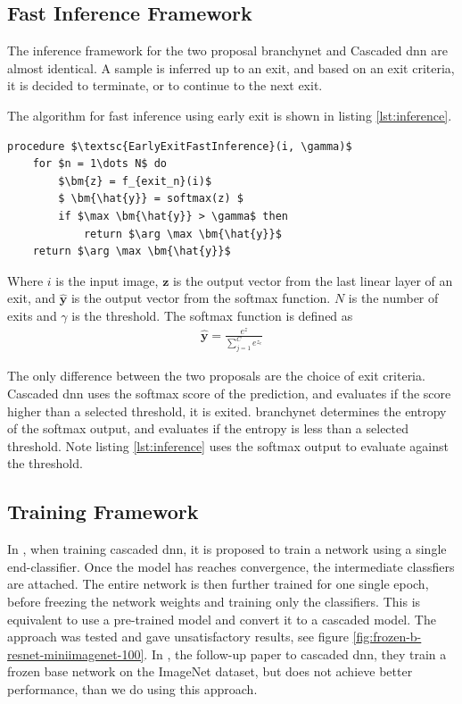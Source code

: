 \subsection{Fast Inference Framework} 

The inference framework for the two proposal \gls{branchynet} and Cascaded \gls{dnn} are almost identical. A sample is inferred up to an exit, and based on an exit criteria, it is decided to terminate, or to continue to the next exit. 

The algorithm for fast inference using early exit is shown in listing \ref{lst:inference}. 

\begin{minipage}{\linewidth}
	\begin{lstlisting}[language = {}, mathescape=true, caption={Early Exit Fast Inference }, label={lst:inference}]
procedure $\textsc{EarlyExitFastInference}(i, \gamma)$
	for $n = 1\dots N$ do
		$\bm{z} = f_{exit_n}(i)$
		$ \bm{\hat{y}} = softmax(z) $
		if $\max \bm{\hat{y}} > \gamma$ then
			return $\arg \max \bm{\hat{y}}$
	return $\arg \max \bm{\hat{y}}$ 
	\end{lstlisting}
\end{minipage}

Where $ i $ is the input image, $ \bm{z} $ is the output vector from the last linear layer of an exit, and $ \bm{\hat{y}} $ is the output vector from the softmax function. $ N $ is the number of exits and $ \gamma $ is the threshold. The softmax function is defined as
\begin{align}
\bm{\hat{y}} = \frac{e^{z}}{\sum_{j=1}^{C}e^{z_c}}
\end{align}

The only difference between the two proposals are the choice of exit criteria. Cascaded \gls{dnn} uses the softmax score of the prediction, and evaluates if the score higher than a selected threshold, it is exited. \gls{branchynet} determines the entropy of the softmax output, and evaluates if the entropy is less than a selected threshold. Note listing \ref{lst:inference} uses the softmax output to evaluate against the threshold.

\subsection{Training Framework} 

In \cite{leroux_resource-constrained_2015}, when training cascaded \gls{dnn}, it is proposed to train a network using a single end-classifier. Once the model has reaches convergence, the intermediate classfiers are attached. The entire network is then further trained for one single epoch, before freezing the network weights and training only the classifiers. This is equivalent to use a pre-trained model and convert it to a cascaded model. The approach was tested and gave unsatisfactory results, see figure \ref{fig:frozen-b-resnet-miniimagenet-100}. In \cite{leroux_cascading_2017}, the follow-up paper to cascaded \gls{dnn}, they train a frozen base network on the ImageNet dataset, but does not achieve better performance, than we do using this approach.  


